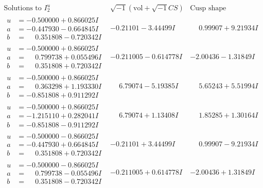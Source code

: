 \documentclass[1p]{elsarticle_modified}
\theoremstyle{definition}
\newcommand{\I}{\sqrt{-1}}
\begin{document}
$$\begin{array}{c|c|c}  
\text{Solutions to }I^u_{2}& \I (\text{vol} + \sqrt{-1}CS) & \text{Cusp shape}\\
 \hline 
\begin{aligned}
u &= -0.500000 + 0.866025 I \\
a &= -0.447930 - 0.664845 I \\
b &= \phantom{-}0.351808 - 0.720342 I\end{aligned}
 & -0.21101 - 3.44499 I & \phantom{-}0.99907 + 9.21934 I \\ \hline\begin{aligned}
u &= -0.500000 + 0.866025 I \\
a &= \phantom{-}0.799738 + 0.055496 I \\
b &= \phantom{-}0.351808 + 0.720342 I\end{aligned}
 & -0.211005 - 0.614778 I & -2.00436 - 1.31849 I \\ \hline\begin{aligned}
u &= -0.500000 + 0.866025 I \\
a &= \phantom{-}0.363298 + 1.193330 I \\
b &= -0.851808 + 0.911292 I\end{aligned}
 & \phantom{-}6.79074 - 5.19385 I & \phantom{-}5.65243 + 5.51994 I \\ \hline\begin{aligned}
u &= -0.500000 + 0.866025 I \\
a &= -1.215110 + 0.282041 I \\
b &= -0.851808 - 0.911292 I\end{aligned}
 & \phantom{-}6.79074 + 1.13408 I & \phantom{-}1.85285 + 1.30164 I \\ \hline\begin{aligned}
u &= -0.500000 - 0.866025 I \\
a &= -0.447930 + 0.664845 I \\
b &= \phantom{-}0.351808 + 0.720342 I\end{aligned}
 & -0.21101 + 3.44499 I & \phantom{-}0.99907 - 9.21934 I \\ \hline\begin{aligned}
u &= -0.500000 - 0.866025 I \\
a &= \phantom{-}0.799738 - 0.055496 I \\
b &= \phantom{-}0.351808 - 0.720342 I\end{aligned}
 & -0.211005 + 0.614778 I & -2.00436 + 1.31849 I \\ \hline\begin{aligned}

\end{aligned}
\end{array}$$
\end{document}

